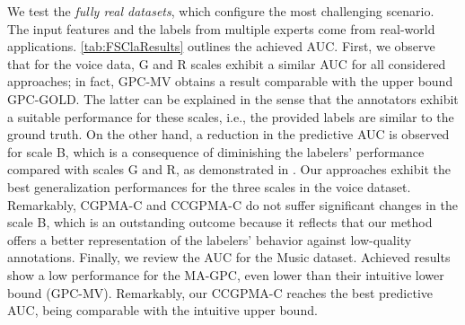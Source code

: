 \documentclass[journal]{IEEEtran}
\begin{document}
We test the \emph{fully real datasets}, which configure the most challenging scenario. The input features and the labels from multiple experts come from real-world applications. \cref{tab:FSClaResults} outlines the achieved AUC. First, we observe that for the voice data, G and R scales exhibit a similar AUC for all considered approaches; in fact, GPC-MV obtains a result comparable with the upper bound GPC-GOLD. The latter can be explained in the sense that the annotators exhibit a suitable performance for these scales, i.e., the provided labels are similar to the ground truth. On the other hand, a reduction in the predictive AUC is observed for scale B, which is a consequence of diminishing the labelers' performance compared with scales G and R, as demonstrated in \cite{gonzalez2015automatic}. Our approaches exhibit the best generalization performances for the three scales in the voice dataset. Remarkably, CGPMA-C and CCGPMA-C do not suffer significant changes in the scale B, which is an outstanding outcome because it reflects that our method offers a better representation of the labelers' behavior against low-quality annotations. Finally, we review the AUC for the Music dataset. Achieved results show a low performance for the MA-GPC, even lower than their intuitive lower bound (GPC-MV). Remarkably, our CCGPMA-C reaches the best predictive AUC, being comparable with the intuitive upper bound. 
\end{document}
